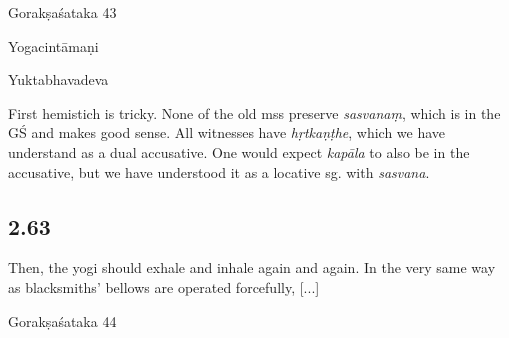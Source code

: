 \begin{ekdosis}
\begin{sources}[hp02_062]
Gorakṣaśataka 43

\begin{versinnote}
\end{versinnote}
\end{sources}

\begin{testimonia}[hp02_062]
Yogacintāmaṇi

\begin{versinnote}
\end{versinnote}

Yuktabhavadeva

\begin{versinnote}
\end{versinnote}
\end{testimonia}

\begin{philcomm}[hp02_062]
First hemistich is tricky. None of the old mss preserve \emph{sasvanaṃ}, which is in the GŚ and makes good sense. All witnesses have \emph{hṛtkaṇṭhe}, which we have understand as a dual accusative. One would expect \emph{kapāla} to also be in the accusative, but we have understood it as a locative sg. with \emph{sasvana}.
\end{philcomm}

\subsection*{2.63}
\begin{translation}[hp02_063]
Then, the yogi should exhale and inhale again and again. In the very same way as blacksmiths’ bellows are operated forcefully, [...]
\end{translation}

\begin{sources}[hp02_063]
Gorakṣaśataka 44

\begin{versinnote}
\end{versinnote}
\end{sources}


\end{ekdosis}
